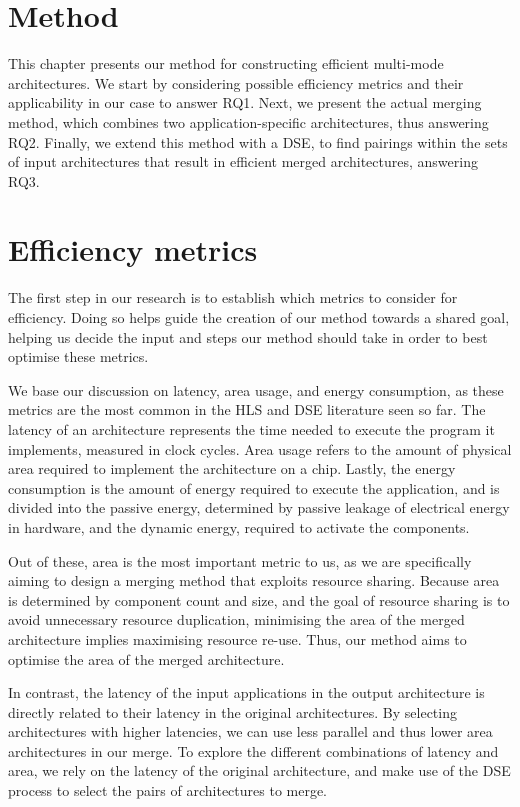 \section{Method}
\label{ch:method}
This chapter presents our method for constructing efficient multi-mode architectures. We start by considering possible efficiency metrics and their applicability in our case to answer RQ1. Next, we present the actual merging method, which combines two application-specific architectures, thus answering RQ2. Finally, we extend this method with a DSE, to find pairings within the sets of input architectures that result in efficient merged architectures, answering RQ3.

\section{Efficiency metrics}
The first step in our research is to establish which metrics to consider for efficiency. Doing so helps guide the creation of our method towards a shared goal, helping us decide the input and steps our method should take in order to best optimise these metrics.

We base our discussion on latency, area usage, and energy consumption, as these metrics are the most common in the HLS and DSE literature seen so far. The latency of an architecture represents the time needed to execute the program it implements, measured in clock cycles. Area usage refers to the amount of physical area required to implement the architecture on a chip. Lastly, the energy consumption is the amount of energy required to execute the application, and is divided into the passive energy, determined by passive leakage of electrical energy in hardware, and the dynamic energy, required to activate the components.

Out of these, area is the most important metric to us, as we are specifically aiming to design a merging method that exploits resource sharing. Because area is determined by component count and size, and the goal of resource sharing is to avoid unnecessary resource duplication, minimising the area of the merged architecture implies maximising resource re-use. Thus, our method aims to optimise the area of the merged architecture.

In contrast, the latency of the input applications in the output architecture is directly related to their latency in the original architectures. By selecting architectures with higher latencies, we can use less parallel and thus lower area architectures in our merge. To explore the different combinations of latency and area, we rely on the latency of the original architecture, and make use of the DSE process to select the pairs of architectures to merge.

